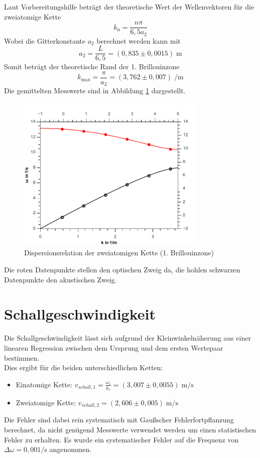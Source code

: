 Laut Vorbereitungshilfe beträgt der theoretische Wert der Wellenvektoren für die zweiatomige Kette
\begin{equation}
	 k_{\textrm{n}} = \frac{n\pi}{6,5a_2}
\end{equation}
Wobei die Gitterkonstante $a_2$ berechnet werden kann mit
\begin{equation}
	a_2 = \frac{L}{6,5} = (0,835 \pm 0,0015)\;\si{\meter}
\end{equation}
Somit beträgt der theoretische Rand der 1. Brillouinzone
\begin{equation}
	k_{\textrm{max}} = \frac{\pi}{a_2} = (3,762 \pm 0,007)\;\si{\per\meter}
\end{equation}
Die gemittelten Messwerte sind in Abbildung \ref{fig:a1_two} dargestellt.
\begin{figure}[h]
	\centering\includegraphics[width=0.8\textwidth]{fig/a1_two}
	\caption{Dispersionsrelation der zweiatomigen Kette (1. Brillouinzone)}
	\label{fig:a1_two}
\end{figure}
Die roten Datenpunkte stellen den optischen Zweig da, die hohlen schwarzen Datenpunkte den akustischen Zweig.

\section{Schallgeschwindigkeit}

Die Schallgeschwindigkeit lässt sich aufgrund der Kleinwinkelnäherung aus einer linearen Regression zwischen dem Ursprung und dem ersten Wertepaar bestimmen.\\
Dies ergibt für die beiden unterschiedlichen Ketten:
\begin{itemize}
	\item Einatomige Kette: $v_{schall,1} = \frac{\omega_1}{k_1} = (3,007 \pm 0,0055)\;\si{\meter\per\second}$
	\item Zweiatomige Kette: $v_{schall,2} = (2,606 \pm 0,005 )\;\si{\meter\per\second}$
\end{itemize}
Die Fehler sind dabei rein systematisch mit Gaußscher Fehlerfortpflanzung berechnet, da nicht genügend Messwerte verwendet werden um einen statistischen Fehler zu erhalten. Es wurde ein systematischer Fehler auf die Frequenz von $\Delta\omega = 0,001 \si{\per\second}$ angenommen.

